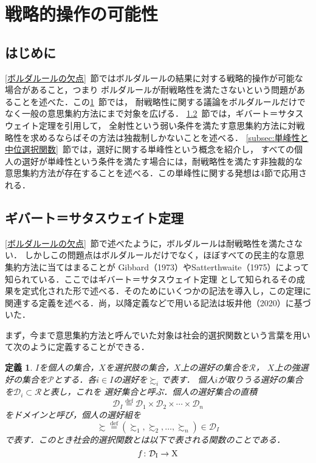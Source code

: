 \documentclass[dvipdfmx]{jsarticle}
\newtheorem*{DEfinition}{定義}
\begin{document}
\section{戦略的操作の可能性}\label{sec:戦略的操作の可能性}
\subsection{はじめに}
\ref{ボルダルールの欠点}~節ではボルダルールの結果に対する戦略的操作が可能な場合があること，つまり
ボルダルールが耐戦略性を満たさないという問題があることを述べた．この\ref{sec:戦略的操作の可能性}~節では，
耐戦略性に関する議論をボルダルールだけでなく一般の意思集約方法にまで対象を広げる．
\ref{subsec:ギバート＝サタスウェイト定理}~節では，ギバート＝サタスウェイト定理を引用して，
全射性という弱い条件を満たす意思集約方法に対戦略性を求めるならばその方法は独裁制しかないことを述べる．
\ref{subsec:単峰性と中位選択関数}~節では，選好に関する単峰性という概念を紹介し，
すべての個人の選好が単峰性という条件を満たす場合には，耐戦略性を満たす非独裁的な
意思集約方法が存在することを述べる．この単峰性に関する発想は4節で応用される．

\subsection{ギバート＝サタスウェイト定理}\label{subsec:ギバート＝サタスウェイト定理}
\ref{ボルダルールの欠点}~節で述べたように，ボルダルールは耐戦略性を満たさない．
しかしこの問題点はボルダルールだけでなく，ほぼすべての民主的な意思集約方法に当てはまることが
Gibbard（1973）やSatterthwaite（1975）によって知られている．ここではギバート＝サタスウェイト定理
として知られるその成果を定式化された形で述べる．そのためにいくつかの記法を導入し，この定理に
関連する定義を述べる．尚，以降定義などで用いる記法は坂井他（2020）に基づいた．

まず，今まで意思集約方法と呼んでいた対象は社会的選択関数という言葉を用いて次のように定義することができる．

\begin{DEfinition}
  $I$を個人の集合，$X$を選択肢の集合，$X$上の選好の集合を$\mathcal{R}$，
  $X$上の強選好の集合を$\mathcal{P}$とする．各$i \in I$の選好を$\succsim_i$で表す．
  個人$i$が取りうる選好の集合を$\mathcal{D}_i \subset \mathcal{R}$と表し，これを
  選好集合と呼ぶ．個人の選好集合の直積
  \[
    \mathcal{D}_I \stackrel{\mathrm{def}}{=} \mathcal{D}_1 \times
    \mathcal{D}_2 \times \cdots \times \mathcal{D}_n
  \]
  をドメインと呼び，個人の選好組を
  \[
    \succsim \stackrel{\mathrm{def}}{=} (\succsim_1, \succsim_2, \ldots, \succsim_n)
      \in \mathcal{D}_I
  \]
  で表す．このとき社会的選択関数とは以下で表される関数のことである．
  \[
    {\mathnormal{f}}\colon \mathcal{D}_{\mathrm{I}} \to \mathrm{X}
  \]
\end{DEfinition}
\end{document}
